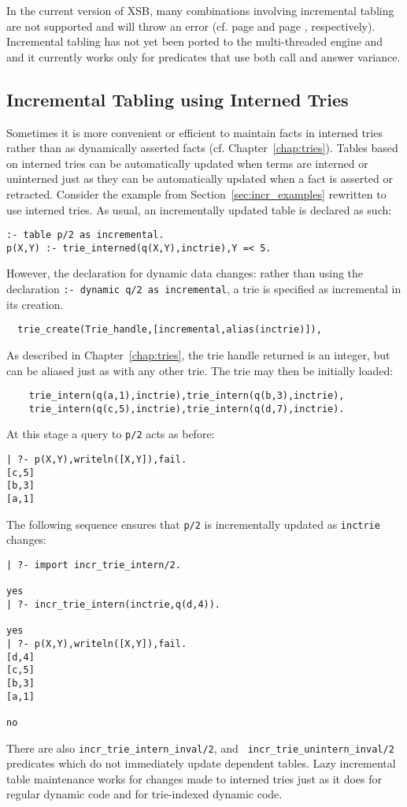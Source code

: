In the current version of XSB, many combinations involving incremental
tabling are not supported and will throw an error (cf. page
\pageref{table-declaration} and page \pageref{dynamic-declaration},
respectively). Incremental tabling has not yet been ported to the
multi-threaded engine and and it currently works only for predicates
that use both call and answer variance.

\subsection{Incremental Tabling using Interned Tries} \label{sec:incr-update-tries}
%
Sometimes it is more convenient or efficient to maintain facts in
interned tries rather than as dynamically asserted facts
(cf. Chapter~\ref{chap:tries}).  Tables based on interned tries can be
automatically updated when terms are interned or uninterned just as
they can be automatically updated when a fact is asserted or
retracted.  Consider the example from Section~\ref{sec:incr_examples}
rewritten to use interned tries.  As usual, an incrementally updated
table is declared as such:
%
\begin{verbatim}
:- table p/2 as incremental.
p(X,Y) :- trie_interned(q(X,Y),inctrie),Y =< 5.
\end{verbatim}
%
However, the declaration for dynamic data changes: rather than using
the declaration {\tt :- dynamic q/2 as incremental}, a trie is
specified as incremental in its creation.
%
\begin{verbatim}
  trie_create(Trie_handle,[incremental,alias(inctrie)]),
\end{verbatim}
%
As described in Chapter~\ref{chap:tries}, the trie handle returned is
an integer, but can be aliased just as with any other trie.  The trie
may then be initially loaded:
%
\begin{verbatim}
	trie_intern(q(a,1),inctrie),trie_intern(q(b,3),inctrie),
	trie_intern(q(c,5),inctrie),trie_intern(q(d,7),inctrie).
\end{verbatim}
%
At this stage a query to {\tt p/2} acts as before:
%
\begin{verbatim}
| ?- p(X,Y),writeln([X,Y]),fail.
[c,5]
[b,3]
[a,1]
\end{verbatim}
%
The following sequence ensures that {\tt p/2} is incrementally updated
as {\tt inctrie} changes:
%
\begin{verbatim}
| ?- import incr_trie_intern/2.

yes
| ?- incr_trie_intern(inctrie,q(d,4)).

yes
| ?- p(X,Y),writeln([X,Y]),fail.
[d,4]
[c,5]
[b,3]
[a,1]

no
\end{verbatim}
%
There are also {\tt incr\_trie\_intern\_inval/2}, and {\tt
  incr\_trie\_unintern\_inval/2} predicates which do not immediately
update dependent tables.  Lazy incremental table maintenance works for
changes made to interned tries just as it does for regular dynamic
code and for trie-indexed dynamic code.


